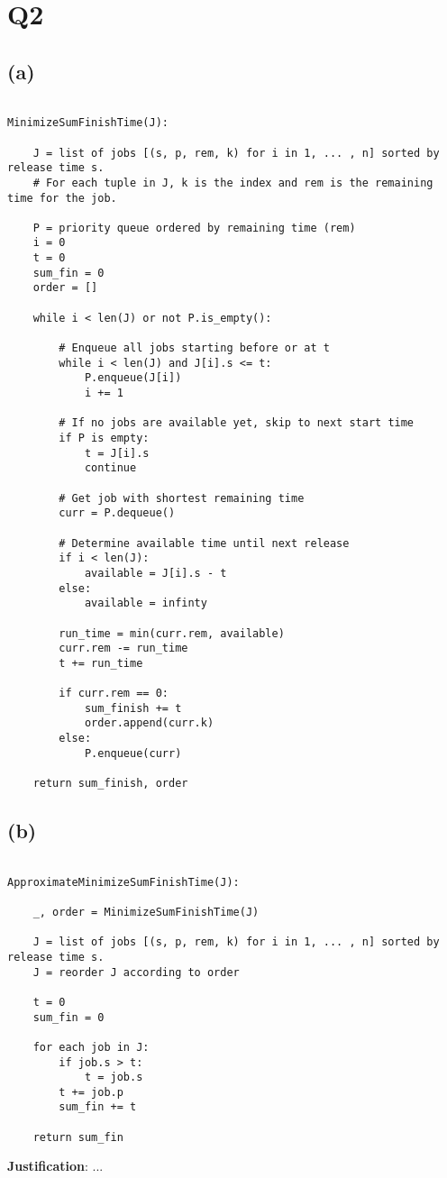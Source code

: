 \section*{Q2}

\subsection*{(a)}

\begin{verbatim}

MinimizeSumFinishTime(J):

    J = list of jobs [(s, p, rem, k) for i in 1, ... , n] sorted by release time s.
    # For each tuple in J, k is the index and rem is the remaining time for the job.
    
    P = priority queue ordered by remaining time (rem)
    i = 0                
    t = 0                
    sum_fin = 0
    order = []

    while i < len(J) or not P.is_empty():
        
        # Enqueue all jobs starting before or at t
        while i < len(J) and J[i].s <= t:
            P.enqueue(J[i])
            i += 1
    
        # If no jobs are available yet, skip to next start time
        if P is empty:
            t = J[i].s
            continue
    
        # Get job with shortest remaining time
        curr = P.dequeue()
    
        # Determine available time until next release
        if i < len(J):
            available = J[i].s - t
        else:
            available = infinty
    
        run_time = min(curr.rem, available)
        curr.rem -= run_time
        t += run_time
    
        if curr.rem == 0:
            sum_finish += t
            order.append(curr.k)
        else:
            P.enqueue(curr)
    
    return sum_finish, order
    \end{verbatim}

\newpage

\subsection*{(b)}

\begin{verbatim}

ApproximateMinimizeSumFinishTime(J):

    _, order = MinimizeSumFinishTime(J)

    J = list of jobs [(s, p, rem, k) for i in 1, ... , n] sorted by release time s.
    J = reorder J according to order

    t = 0
    sum_fin = 0

    for each job in J:
        if job.s > t:
            t = job.s
        t += job.p
        sum_fin += t

    return sum_fin
\end{verbatim}

\textbf{Justification}:
...
    
